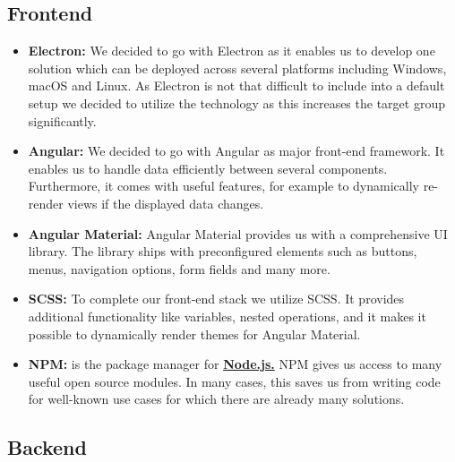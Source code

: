 \subsection{Frontend}\label{subsec:frontend}

\begin{itemize}
    \item \textbf{Electron:} We decided to go with Electron as it enables us to develop one solution which can be
        deployed across several platforms including Windows, macOS and Linux. As Electron is not that difficult to
        include into a default setup we decided to utilize the technology as this increases the target group
        significantly.
    \item \textbf{Angular:} We decided to go with Angular as major front-end framework. It enables us to handle data
        efficiently between several components. Furthermore, it comes with useful features, for example to dynamically
        re-render views if the displayed data changes.
    \item \textbf{Angular Material:} Angular Material provides us with a comprehensive UI library. The library ships
        with preconfigured elements such as buttons, menus, navigation options, form fields and many more.
    \item \textbf{SCSS:} To complete our front-end stack we utilize SCSS. It provides additional functionality like
        variables, nested operations, and it makes it possible to dynamically render themes for Angular Material.
    \item \textbf{NPM:} is the package manager for \hyperref[subsec:backend]{\textbf{Node.js.}} NPM gives us access to many useful open source modules. In many cases, this saves us from writing code for well-known use cases for which there are already many solutions.
\end{itemize}

\subsection{Backend}\label{subsec:backend}

